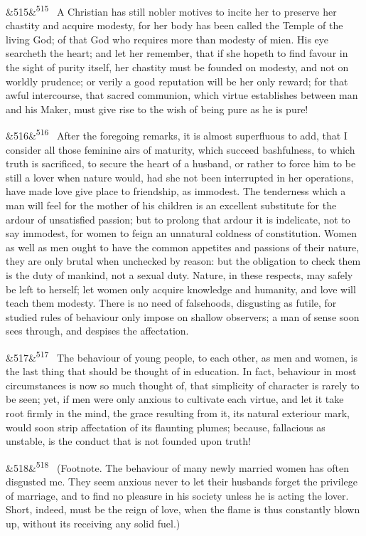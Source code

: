 \documentclass[12pt]{article}
\newcommand{\para}[1][]{\par\noindent\ifx&#1&\else\textsuperscript{\footnotesize #1}~\fi}
\begin{document}
\para[515] A Christian has still nobler motives to incite her to preserve her chastity and acquire modesty, for her body has been called the Temple of the living God; of that God who requires more than modesty of mien. His eye searcheth the heart; and let her remember, that if she hopeth to find favour in the sight of purity itself, her chastity must be founded on modesty, and not on worldly prudence; or verily a good reputation will be her only reward; for that awful intercourse, that sacred communion, which virtue establishes between man and his Maker, must give rise to the wish of being pure as he is pure!

\para[516] After the foregoing remarks, it is almost superfluous to add, that I consider all those feminine airs of maturity, which succeed bashfulness, to which truth is sacrificed, to secure the heart of a husband, or rather to force him to be still a lover when nature would, had she not been interrupted in her operations, have made love give place to friendship, as immodest. The tenderness which a man will feel for the mother of his children is an excellent substitute for the ardour of unsatisfied passion; but to prolong that ardour it is indelicate, not to say immodest, for women to feign an unnatural coldness of constitution. Women as well as men ought to have the common appetites and passions of their nature, they are only brutal when unchecked by reason: but the obligation to check them is the duty of mankind, not a sexual duty. Nature, in these respects, may safely be left to herself; let women only acquire knowledge and humanity, and love will teach them modesty. There is no need of falsehoods, disgusting as futile, for studied rules of behaviour only impose on shallow observers; a man of sense soon sees through, and despises the affectation.

\para[517] The behaviour of young people, to each other, as men and women, is the last thing that should be thought of in education. In fact, behaviour in most circumstances is now so much thought of, that simplicity of character is rarely to be seen; yet, if men were only anxious to cultivate each virtue, and let it take root firmly in the mind, the grace resulting from it, its natural exteriour mark, would soon strip affectation of its flaunting plumes; because, fallacious as unstable, is the conduct that is not founded upon truth!

\para[518] (Footnote. The behaviour of many newly married women has often disgusted me. They seem anxious never to let their husbands forget the privilege of marriage, and to find no pleasure in his society unless he is acting the lover. Short, indeed, must be the reign of love, when the flame is thus constantly blown up, without its receiving any solid fuel.)
\end{document}
